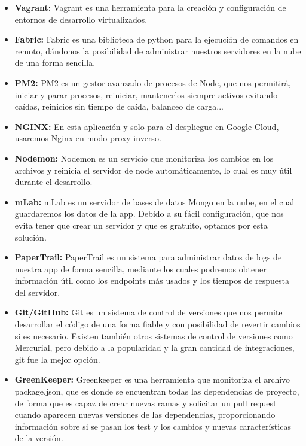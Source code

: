 \begin{itemize}
  \item \textbf{Vagrant:} Vagrant es una herramienta para la creación y configuración de entornos de desarrollo virtualizados.
  
  \item \textbf{Fabric: } Fabric es una biblioteca de python para la ejecución de comandos en remoto, dándonos la posibilidad de administrar nuestros servidores en la nube de una forma sencilla.
  
  \item \textbf{PM2:} PM2 es un gestor avanzado de procesos de Node, que nos permitirá, iniciar y parar procesos, reiniciar, mantenerlos siempre activos evitando caídas, reinicios sin tiempo de caída, balanceo de carga...
  
  \item \textbf{NGINX:} En esta aplicación y solo para el despliegue en Google Cloud, usaremos Nginx en modo \gls{proxy inverso}.
  
  \item \textbf{Nodemon:} Nodemon es un servicio que monitoriza los cambios en los archivos y reinicia el servidor de node automáticamente, lo cual es muy útil durante el desarrollo.
  
  \item \textbf{mLab:} mLab es un servidor de bases de datos Mongo en la nube, en el cual guardaremos los datos de la app. Debido a su fácil configuración, que nos evita tener que crear un servidor y que es gratuito, optamos por esta solución.
  
  \item \textbf{PaperTrail:} PaperTrail es un sistema para administrar datos de logs de nuestra app de forma sencilla, mediante los cuales podremos obtener información útil como los endpoints más usados y los tiempos de respuesta del servidor.
  
  \item \textbf{Git/GitHub:} Git es un sistema de control de versiones que nos permite desarrollar el código de una forma fiable y con posibilidad de revertir cambios si es necesario. Existen también otros sistemas de control de versiones como Mercurial, pero debido a la popularidad y la gran cantidad de integraciones, \gls{git} fue la mejor opción.
  
  \item \textbf{GreenKeeper:} Greenkeeper es una herramienta que monitoriza el archivo package.json, que es donde se encuentran todas las dependencias de proyecto, de forma que es capaz de crear nuevas ramas y solicitar un pull request cuando aparecen nuevas versiones de las dependencias, proporcionando información sobre si se pasan los test y los cambios y nuevas características de la versión.
  

\end{itemize}
